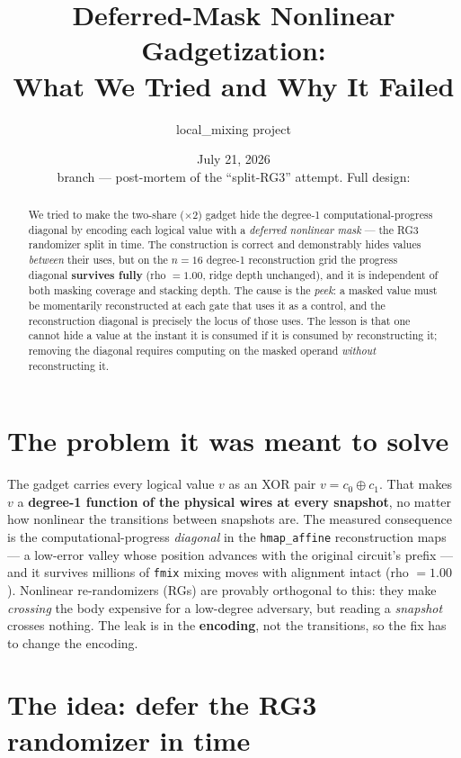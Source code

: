 \documentclass[11pt]{article}
\title{\textbf{Deferred-Mask Nonlinear Gadgetization:\\ What We Tried and Why
It Failed}}
\author{local\_mixing project}
\date{July 21, 2026 \\ \small branch \code{ssg-gen-mix-clean} --- post-mortem
of the ``split-RG3'' attempt. Full design: \code{docs/NONLINEAR\_SHARE\_ENCODING.*}}
\newcommand{\code}[1]{\texttt{#1}}
\begin{document}
\maketitle

\begin{abstract}
\noindent We tried to make the two-share ($\times2$) gadget hide the
degree-1 computational-progress diagonal by encoding each logical value with
a \emph{deferred nonlinear mask} --- the RG3 randomizer split in time. The
construction is correct and demonstrably hides values \emph{between} their
uses, but on the $n{=}16$ degree-1 reconstruction grid the progress diagonal
\textbf{survives fully} (rho $=1.00$, ridge depth unchanged), and it is
independent of both masking coverage and stacking depth. The cause is the
\emph{peek}: a masked value must be momentarily reconstructed at each gate
that uses it as a control, and the reconstruction diagonal is precisely the
locus of those uses. The lesson is that one cannot hide a value at the
instant it is consumed if it is consumed by reconstructing it; removing the
diagonal requires computing on the masked operand \emph{without}
reconstructing it.
\end{abstract}

\section{The problem it was meant to solve}

The gadget carries every logical value $v$ as an XOR pair $v = c_0 \oplus
c_1$. That makes $v$ a \textbf{degree-1 function of the physical wires at
every snapshot}, no matter how nonlinear the transitions between snapshots
are. The measured consequence is the computational-progress \emph{diagonal}
in the \code{hmap\_affine} reconstruction maps --- a low-error valley whose
position advances with the original circuit's prefix --- and it survives
millions of \code{fmix} mixing moves with alignment intact (rho $= 1.00$).
Nonlinear re-randomizers (RGs) are provably orthogonal to this: they make
\emph{crossing} the body expensive for a low-degree adversary, but reading a
\emph{snapshot} crosses nothing. The leak is in the \textbf{encoding}, not
the transitions, so the fix has to change the encoding.

\section{The idea: defer the RG3 randomizer in time}
\end{document}
